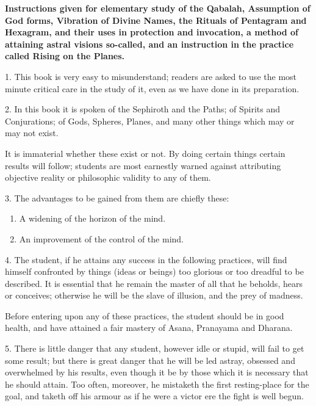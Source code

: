 \textbf{Instructions given for elementary study of the Qabalah, Assumption of God forms, Vibration of Divine Names, the Rituals of Pentagram and Hexagram, and their uses in protection and invocation, a method of attaining astral visions so-called, and an instruction in the practice called Rising on the Planes.}


1. This book is very easy to misunderstand; readers are asked to use the most minute critical care in the study of it, even as we have done in its preparation.

2. In this book it is spoken of the Sephiroth and the Paths; of Spirits and Conjurations; of Gods, Spheres, Planes, and many other things which may or may not exist.

It is immaterial whether these exist or not. By doing certain things certain results will follow; students are most earnestly warned against attributing objective reality or philosophic validity to any of them.

3. The advantages to be gained from them are chiefly these:

\begin{enumerate}[label=(\textit{\alph*})]
\item A widening of the horizon of the mind.
\item An improvement of the control of the mind.
\end{enumerate}

4. The student, if he attains any success in the following practices, will find himself confronted by things (ideas or beings) too glorious or too dreadful to be described. It is essential that he remain the master of all that he beholds, hears or conceives; otherwise he will be the slave of illusion, and the prey of madness.

Before entering upon any of these practices, the student should be in good health, and have attained a fair mastery of Asana, Pranayama and Dharana.

5. There is little danger that any student, however idle or stupid, will fail to get some result; but there is great danger that he will be led astray, obsessed and overwhelmed by his results, even though it be by those which it is necessary that he should attain. Too often, moreover, he mistaketh the first resting-place for the goal, and taketh off his armour as if he were a victor ere the fight is well begun.

